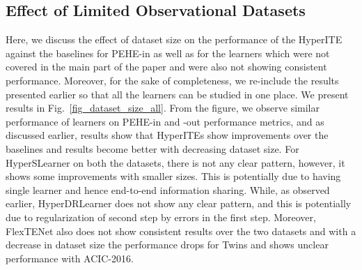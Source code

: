\documentclass{article}
\begin{document}
\subsection{Effect of Limited Observational Datasets}
\label{subapp_dataset_size}
Here, we discuss the effect of dataset size on the performance of the HyperITE against the baselines for PEHE-in as well as for the learners which were not covered in the main part of the paper and were also not showing consistent performance. Moreover, for the sake of completeness, we re-include the results presented earlier so that all the learners can be studied in one place.
We present results in Fig.~\ref{fig_dataset_size_all}. From the figure, we observe similar performance of learners on PEHE-in and -out performance metrics, and as discussed earlier, results show that HyperITEs show improvements over the baselines and results become better with decreasing dataset size.
For HyperSLearner on both the datasets, there is not any clear pattern, however, it shows some improvements with smaller sizes. This is potentially due to having single learner and hence end-to-end information sharing. While, as observed earlier, HyperDRLearner does not show any clear pattern, and this is potentially due to regularization of second step by errors in the first step. Moreover, FlexTENet also does not show consistent results over the two datasets and with a decrease in dataset size the performance drops for Twins and shows unclear performance with ACIC-2016.
\end{document}
